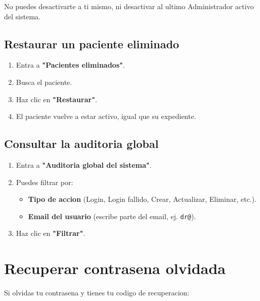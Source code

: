 \documentclass[11pt,a4paper]{article}
\begin{document}
\begin{cajaTip}
    No puedes desactivarte a ti mismo, ni desactivar al ultimo Administrador activo del sistema.
\end{cajaTip}

\subsection{Restaurar un paciente eliminado}

\begin{enumerate}
    \item Entra a \textbf{"Pacientes eliminados"}.
    \item Busca el paciente.
    \item Haz clic en \textbf{"Restaurar"}.
    \item El paciente vuelve a estar activo, igual que su expediente.
\end{enumerate}

\subsection{Consultar la auditoria global}

\begin{enumerate}
    \item Entra a \textbf{"Auditoria global del sistema"}.
    \item Puedes filtrar por:
          \begin{itemize}
              \item \textbf{Tipo de accion} (Login, Login fallido, Crear, Actualizar, Eliminar, etc.).
              \item \textbf{Email del usuario} (escribe parte del email, ej. \texttt{dr@}).
          \end{itemize}
    \item Haz clic en \textbf{"Filtrar"}.
\end{enumerate}

\section{Recuperar contrasena olvidada}

Si olvidas tu contrasena y tienes tu codigo de recuperacion:
\end{document}
